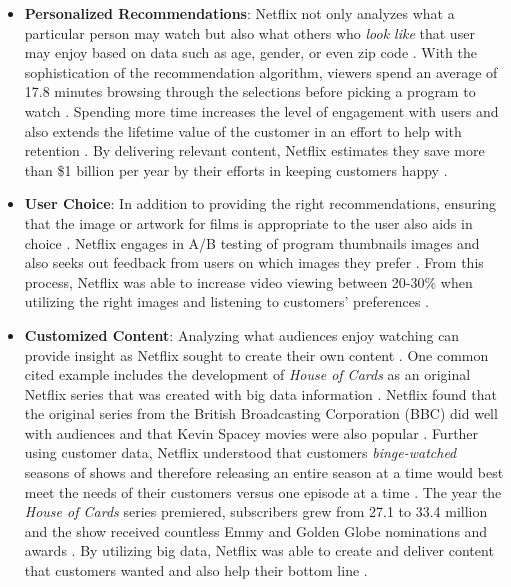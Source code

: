 \documentclass[sigconf]{acmart}
\begin{document}
 \begin{itemize}
    \item \textbf{Personalized Recommendations}: Netflix not only analyzes what a particular person may watch but also what others who \textit{look like} that user may enjoy based on data such as age, gender, or even zip code \cite{Jenkins2016}. With the sophistication of the recommendation algorithm, viewers spend an average of 17.8 minutes browsing through the selections before picking a program to watch       \cite{Jenkins2016}. Spending more time increases the level of engagement with users and also extends the lifetime value of the customer in an effort to help with retention \cite{Cohen2017}. By delivering relevant content, Netflix estimates they save more than \$1 billion per year by their efforts in keeping customers happy \cite{Cohen2017}. 
    \item \textbf{User Choice}: In addition to providing the right recommendations, ensuring that the image or artwork for films is appropriate to the user also aids in choice \cite{Cohen2017}. Netflix engages in A/B testing of program thumbnails images and also seeks out feedback from users on which images they prefer \cite{Cohen2017}. From this process, Netflix was able to increase video viewing between 20-30\% when utilizing the right images and listening to customers' preferences \cite{Cohen2017}. 
    \item \textbf{Customized Content}: Analyzing what audiences enjoy watching can provide insight as Netflix sought to create their own content \cite{Jenkins2016}. One common cited example includes the development of \textit{House of Cards} as an original Netflix series that was created with big data information \cite{Jenkins2016}. Netflix found that the original series from the British Broadcasting Corporation (BBC) did well with audiences and that Kevin Spacey movies were also popular \cite{Jenkins2016}. Further using customer data, Netflix understood that customers \textit{binge-watched} seasons of shows and therefore releasing an entire season at a time would best meet the needs of their customers versus one episode at a time \cite{Jenkins2016}. The year the \textit{House of Cards} series premiered, subscribers grew from 27.1 to 33.4 million and the show received countless Emmy and Golden Globe nominations and awards \cite{Jenkins2016}. By utilizing big data, Netflix was able to create and deliver content that customers wanted and also help their bottom line \cite{Jenkins2016}. 
\end{itemize}
\end{document}
